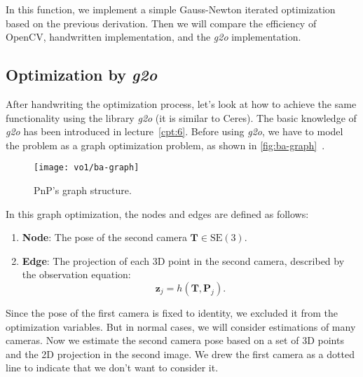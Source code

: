 In this function, we implement a simple Gauss-Newton iterated optimization based on the previous derivation. Then we will compare the efficiency of OpenCV, handwritten implementation, and the \textit{g2o} implementation.

\subsection{Optimization by \textit{g2o}}
After handwriting the optimization process, let's look at how to achieve the same functionality using the library \textit{g2o} (it is similar to Ceres). The basic knowledge of \textit{g2o} has been introduced in lecture~\ref{cpt:6}. Before using \textit{g2o}, we have to model the problem as a graph optimization problem, as shown in \autoref{fig:ba-graph}~.

\begin{figure}[!htp]
	\centering
	\texttt{[image: vo1/ba-graph]}
	\caption{PnP's graph structure.}
	\label{fig:ba-graph}
\end{figure}

In this graph optimization, the nodes and edges are defined as follows:
\begin{enumerate}
	\item \textbf{Node}: The pose of the second camera $\mathbf{T} \in \mathrm{SE}(3)$.
	\item \textbf{Edge}: The projection of each 3D point in the second camera, described by the observation equation:
	\[
	\mathbf{z}_j = h(\mathbf{T}, \mathbf{P}_{j}).
	\]
\end{enumerate}

Since the pose of the first camera is fixed to identity, we excluded it from the optimization variables. But in normal cases, we will consider estimations of many cameras. Now we estimate the second camera pose based on a set of 3D points and the 2D projection in the second image. We drew the first camera as a dotted line to indicate that we don't want to consider it.

